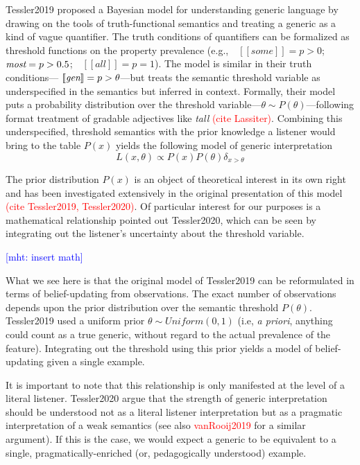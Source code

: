 \documentclass[10pt,letterpaper]{article}
\newcommand{\denote}[1]{\mbox{ $[\![ #1 ]\!]$}}
\newcommand{\red}[1]{\textcolor{Red}{#1}}
\newcommand{\mht}[1]{\textcolor{Blue}{[mht: #1]}}
\begin{document}
Tessler2019 proposed a Bayesian model for understanding generic language by drawing on the tools of truth-functional semantics and treating a generic as a kind of vague quantifier.
The truth conditions of quantifiers can be formalized as threshold functions on the property prevalence (e.g., $\denote{some} = p > 0$; $\emph{most}= p > 0.5$; $\denote{all} = p = 1$). The model is similar in their truth conditions---$\denote{\emph{gen}} = p > \theta$---but treats the  
semantic threshold variable as underspecified in the semantics but inferred in context. Formally, their model puts a probability distribution over the threshold variable---$\theta \sim P(\theta)$---following format treatment of gradable adjectives like \emph{tall} \red{(cite Lassiter)}. Combining this underspecified, threshold semantics with the prior knowledge a listener would bring to the table $P(x)$ yields the following model of generic interpretation
$$
L(x, \theta) \propto P(x) P(\theta) \delta_{x > \theta}
$$

The prior distribution $P(x)$ is an object of theoretical interest in its own right and has been investigated extensively in the original presentation of this model \red{(cite Tessler2019, Tessler2020)}. 
Of particular interest for our purposes is a mathematical relationship pointed out Tessler2020, which can be seen by integrating out the listener's uncertainty about the threshold variable. 

\mht{insert math}

What we see here is that the original model of Tessler2019 can be reformulated in terms of belief-updating from observations. 
The exact number of observations depends upon the prior distribution over the semantic threshold $P(\theta)$.  
Tessler2019 used a uniform prior $\theta \sim Uniform(0,1)$ (i.e, \emph{a priori}, anything could count as a true generic, without regard to the actual prevalence of the feature).
Integrating out the threshold using this prior yields a model of belief-updating given a single example. 

It is important to note that this relationship is only manifested at the level of a literal listener.
Tessler2020 argue that the strength of generic interpretation should be understood not as a literal listener interpretation but as a pragmatic interpretation of a weak semantics (see also \red{vanRooij2019} for a similar argument). 
If this is the case, we would expect a generic to be equivalent to a single, pragmatically-enriched (or, pedagogically understood) example. 
\end{document}
